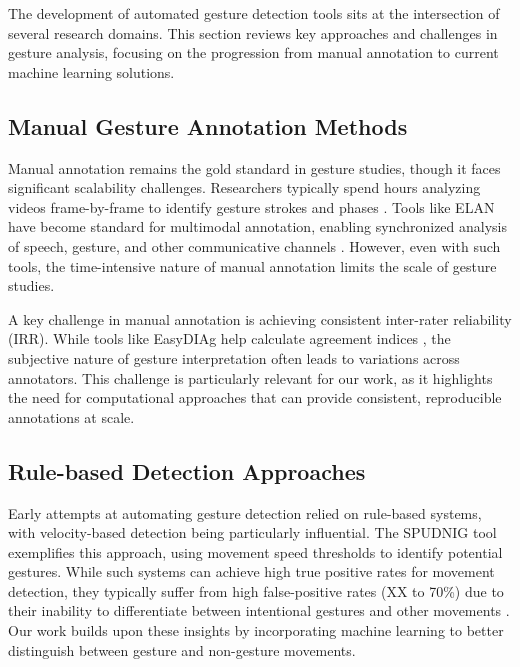 The development of automated gesture detection tools sits at the intersection of several research domains. This section reviews key approaches and challenges in gesture analysis, focusing on the progression from manual annotation to current machine learning solutions.

\subsection{Manual Gesture Annotation Methods}\label{subsec:manual}
Manual annotation remains the gold standard in gesture studies, though it faces significant scalability challenges. Researchers typically spend hours analyzing videos frame-by-frame to identify gesture strokes and phases \citep{ripperdaSpeedingDetectionNoniconic2020}. Tools like ELAN have become standard for multimodal annotation, enabling synchronized analysis of speech, gesture, and other communicative channels \citep{kongMultimodalAnalysisTool2014}. However, even with such tools, the time-intensive nature of manual annotation limits the scale of gesture studies.

A key challenge in manual annotation is achieving consistent inter-rater reliability (IRR). While tools like EasyDIAg help calculate agreement indices \citep{holleAutomaticReliabilityAssessment2014}, the subjective nature of gesture interpretation often leads to variations across annotators. This challenge is particularly relevant for our work, as it highlights the need for computational approaches that can provide consistent, reproducible annotations at scale.

\subsection{Rule-based Detection Approaches}\label{subsec:rule}
Early attempts at automating gesture detection relied on rule-based systems, with velocity-based detection being particularly influential. The SPUDNIG tool \citep{ripperdaSpeedingDetectionNoniconic2020} exemplifies this approach, using movement speed thresholds to identify potential gestures. While such systems can achieve high true positive rates for movement detection, they typically suffer from high false-positive rates (XX to 70\%) due to their inability to differentiate between intentional gestures and other movements \citep{pouwSemanticallyRelatedGestures2021}. Our work builds upon these insights by incorporating machine learning to better distinguish between gesture and non-gesture movements.

